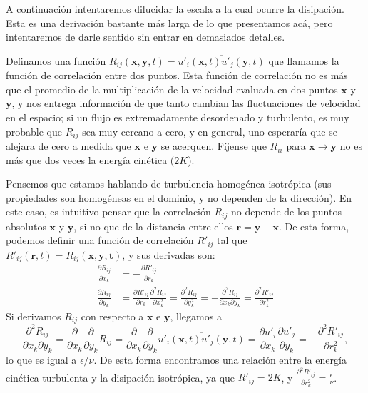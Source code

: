 A continuación intentaremos dilucidar la escala a la cual ocurre la disipación.
Esta es una derivación bastante más larga de lo que presentamos acá, pero intentaremos de darle sentido sin entrar en demasiados detalles.

Definamos una función $R_{ij}(\mathbf{x},\mathbf{y},t) = \overline{u'_i(\mathbf{x},t)u'_j(\mathbf{y},t)}$ que llamamos la función de correlación entre dos puntos.
Esta función de correlación no es más que el promedio de la multiplicación de la velocidad evaluada en dos puntos $\mathbf{x}$ y $\mathbf{y}$, y nos entrega información de que tanto cambian las fluctuaciones de velocidad en el espacio; si un flujo es extremadamente desordenado y turbulento, es muy probable que $R_{ij}$ sea muy cercano a cero, y en general, uno esperaría que se alejara de cero a medida que $\mathbf{x}$ e $\mathbf{y}$ se acerquen.
Fíjense que $R_{ii}$ para $\mathbf{x}\to\mathbf{y}$ no es más que dos veces la energía cinética ($2K$).

Pensemos que estamos hablando de turbulencia homogénea isotrópica (sus propiedades son homogéneas en el dominio, y no dependen de la dirección).
En este caso, es intuitivo pensar que la correlación $R_{ij}$ no depende de los puntos absolutos $\mathbf{x}$ y $\mathbf{y}$, si no que de la distancia entre ellos $\mathbf{r} = \mathbf{y}-\mathbf{x}$.
De esta forma, podemos definir una función de correlación $R'_{ij}$ tal que $R'_{ij}(\mathbf{r},t) = R_{ij}(\mathbf{x},\mathbf{y},\mathbf{t})$, y sus derivadas son:
%
\begin{align}
\frac{\partial R_{ij}}{\partial x_k} &= -\frac{\partial R'_{ij}}{\partial r_k} \nonumber \\
\frac{\partial R_{ij}}{\partial y_k} &= \frac{\partial R'_{ij}}{\partial r_k} 
\frac{\partial^2 R_{ij}}{\partial x_k^2} = \frac{\partial^2 R_{ij}}{\partial y_k^2} = -\frac{\partial^2 R_{ij}}{\partial x_k\partial y_k} = \frac{\partial^2 R'_{ij}}{\partial r_k^2} 
\end{align}
%
Si derivamos $R_{ij}$ con respecto a $\mathbf{x}$ e $\mathbf{y}$, llegamos a
%
\begin{equation}
\frac{\partial^2R_{ij}}{\partial x_k\partial y_k} = \frac{\partial}{\partial x_k}\frac{\partial}{\partial y_k} R_{ij} =\frac{\partial}{\partial x_k}\frac{\partial}{\partial y_k} \overline{u'_i(\mathbf{x},t)u'_j(\mathbf{y},t)} = \overline{\frac{\partial u'_i}{\partial x_k}\frac{\partial u'_j}{\partial y_k}} = -\frac{\partial^2 R'_{ij}}{\partial r_k^2},
\end{equation}
%
lo que es igual a $\epsilon/\nu$.
De esta forma encontramos una relación entre la energía cinética turbulenta y la disipación isotrópica, ya que $R'_{ij} = 2K$, y $\frac{\partial^2 R'_{ij}}{\partial r_k^2} = \frac{\epsilon}{\nu}$.
